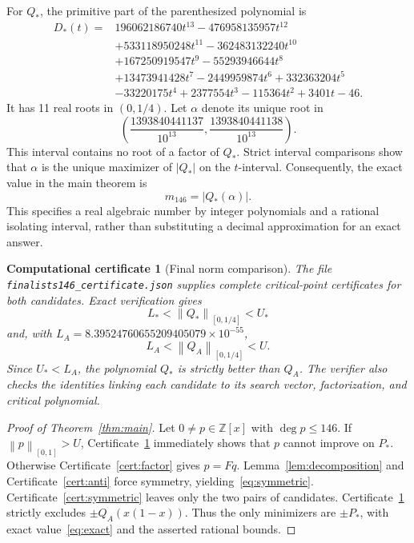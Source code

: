 \documentclass[11pt,a4paper]{article}
\newtheorem{certificate}[theorem]{Computational certificate}
\newcommand{\Z}{\mathbb Z}
\newcommand{\norm}[1]{\left\lVert#1\right\rVert}
\newcommand{\file}[1]{{\small\nolinkurl{#1}}}
\begin{document}
For $Q_*$, the primitive part of the parenthesized polynomial is
\begin{align*}
D_*(t)={}&196062186740t^{13}-476958135957t^{12}\\
&+533118950248t^{11}-362483132240t^{10}\\
&+167250919547t^9-55293946644t^8\\
&+13473941428t^7-2449959874t^6+332363204t^5\\
&-33220175t^4+2377554t^3-115364t^2+3401t-46.
\end{align*}
It has 11 real roots in $(0,1/4)$. Let $\alpha$ denote its unique root in
\begin{equation}\label{eq:alpha}
\left(\frac{1393840441137}{10^{13}},\frac{1393840441138}{10^{13}}\right).
\end{equation}
This interval contains no root of a factor of $Q_*$. Strict interval comparisons show that $\alpha$ is the unique maximizer of $|Q_*|$ on the $t$-interval. Consequently, the exact value in the main theorem is
\begin{equation}\label{eq:exact}
m_{146}=|Q_*(\alpha)|.
\end{equation}
This specifies a real algebraic number by integer polynomials and a rational isolating interval, rather than substituting a decimal approximation for an exact answer.

\begin{certificate}[Final norm comparison]\label{cert:norm}
The file \file{finalists146_certificate.json} supplies complete critical-point certificates for both candidates. Exact verification gives
\[
L_*<\norm{Q_*}_{[0,1/4]}<U_*
\]
and, with $L_A=8.39524760655209405079\times10^{-55}$,
\[
L_A<\norm{Q_A}_{[0,1/4]}<U.
\]
Since $U_*<L_A$, the polynomial $Q_*$ is strictly better than $Q_A$. The verifier also checks the identities linking each candidate to its search vector, factorization, and critical polynomial.
\end{certificate}

\begin{proof}[Proof of Theorem~\ref{thm:main}]
Let $0\ne p\in\Z[x]$ with $\deg p\le146$. If $\norm p_{[0,1]}>U$, Certificate~\ref{cert:norm} immediately shows that $p$ cannot improve on $P_*$. Otherwise Certificate~\ref{cert:factor} gives $p=Fq$. Lemma~\ref{lem:decomposition} and Certificate~\ref{cert:anti} force symmetry, yielding~\eqref{eq:symmetric}. Certificate~\ref{cert:symmetric} leaves only the two pairs of candidates. Certificate~\ref{cert:norm} strictly excludes $\pm Q_A(x(1-x))$. Thus the only minimizers are $\pm P_*$, with exact value~\eqref{eq:exact} and the asserted rational bounds.
\end{proof}
\end{document}
